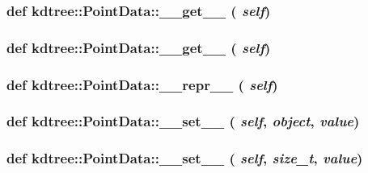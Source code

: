 \label{classkdtree_1_1PointData_a5000beba86f5112731c5cf9e7243541e}
\hypertarget{classkdtree_1_1PointData_a5000beba86f5112731c5cf9e7243541e}{
\subsubsection[{\_\-\_\-get\_\-\_\-}]{\setlength{\rightskip}{0pt plus 5cm}def kdtree::PointData::\_\-\_\-get\_\-\_\- ( {\em self})}}
\label{classkdtree_1_1PointData_a5000beba86f5112731c5cf9e7243541e}
\hypertarget{classkdtree_1_1PointData_a5000beba86f5112731c5cf9e7243541e}{
\subsubsection[{\_\-\_\-get\_\-\_\-}]{\setlength{\rightskip}{0pt plus 5cm}def kdtree::PointData::\_\-\_\-get\_\-\_\- ( {\em self})}}
\label{classkdtree_1_1PointData_a5000beba86f5112731c5cf9e7243541e}
\hypertarget{classkdtree_1_1PointData_a64772819f9e0b27fc161e9072fd58806}{
\subsubsection[{\_\-\_\-repr\_\-\_\-}]{\setlength{\rightskip}{0pt plus 5cm}def kdtree::PointData::\_\-\_\-repr\_\-\_\- ( {\em self})}}
\label{classkdtree_1_1PointData_a64772819f9e0b27fc161e9072fd58806}
\hypertarget{classkdtree_1_1PointData_a1f8080905a01c797e4a87153356b8ea6}{
\subsubsection[{\_\-\_\-set\_\-\_\-}]{\setlength{\rightskip}{0pt plus 5cm}def kdtree::PointData::\_\-\_\-set\_\-\_\- ( {\em self}, \/   {\em object}, \/   {\em value})}}
\label{classkdtree_1_1PointData_a1f8080905a01c797e4a87153356b8ea6}
\hypertarget{classkdtree_1_1PointData_a1f8080905a01c797e4a87153356b8ea6}{
\subsubsection[{\_\-\_\-set\_\-\_\-}]{\setlength{\rightskip}{0pt plus 5cm}def kdtree::PointData::\_\-\_\-set\_\-\_\- ( {\em self}, \/   {\em size\_\-t}, \/   {\em value})}}
